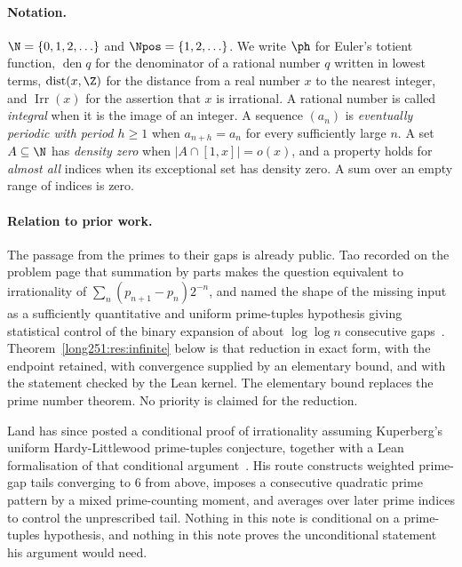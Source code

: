 \documentclass[11pt]{article}
\begin{document}
\paragraph{Notation.}
$\N=\{0,1,2,\ldots\}$ and $\Npos=\{1,2,\ldots\}$.  We write $\ph$ for Euler's
totient function, $\operatorname{den}q$ for the denominator of a rational
number $q$ written in lowest terms, $\operatorname{dist}(x,\Z)$ for the
distance from a real number $x$ to the nearest integer, and
$\operatorname{Irr}(x)$ for the assertion that $x$ is irrational.  A rational
number is called \emph{integral} when it is the image of an integer.  A
sequence $(a_n)$ is \emph{eventually periodic with period $h\ge1$} when
$a_{n+h}=a_n$ for every sufficiently large $n$.  A set $A\subseteq\N$ has
\emph{density zero} when $|A\cap[1,x]|=o(x)$, and a property holds for
\emph{almost all} indices when its exceptional set has density zero.  A sum
over an empty range of indices is zero.

\paragraph{Relation to prior work.}
The passage from the primes to their gaps is already public.  Tao recorded on
the problem page that summation by parts makes the question equivalent to
irrationality of $\sum_n(p_{n+1}-p_n)2^{-n}$, and named the shape of the
missing input as a sufficiently quantitative and uniform prime-tuples
hypothesis giving statistical control of the binary expansion of about
$\log\log n$ consecutive gaps~\cite[comment of 7 October 2025]{erdosproblems251thread}.
Theorem~\ref{long251:res:infinite} below is that reduction in exact form, with the
endpoint retained, with convergence supplied by an elementary bound, and with
the statement checked by the Lean kernel.  The elementary bound replaces the
prime number theorem.  No priority is claimed for the reduction.

Land has since posted a conditional proof of irrationality assuming
Kuperberg's uniform Hardy-Littlewood prime-tuples conjecture, together with a
Lean formalisation of that conditional
argument~\cite[Conjecture~1 and \S1]{land2026}.  His route constructs weighted
prime-gap tails converging to $6$ from above, imposes a consecutive quadratic
prime pattern by a mixed prime-counting moment, and averages over later prime
indices to control the unprescribed tail.  Nothing in this note is
conditional on a prime-tuples hypothesis, and nothing in this note proves the
unconditional statement his argument would need.
\end{document}
